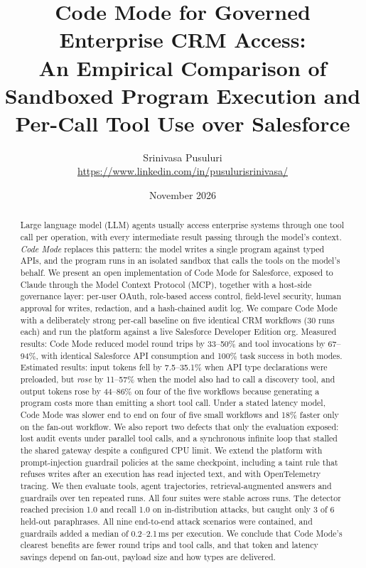 \documentclass[11pt]{article}
\title{Code Mode for Governed Enterprise CRM Access:\\
An Empirical Comparison of Sandboxed Program Execution and Per-Call Tool Use over Salesforce}
\author{Srinivasa Pusuluri\\[2pt]\small \url{https://www.linkedin.com/in/pusulurisrinivasa/}}
\date{November 2026}
\begin{document}
\maketitle

\begin{abstract}
Large language model (LLM) agents usually access enterprise systems through one tool call per operation, with every intermediate result passing through the model's context. \emph{Code Mode} replaces this pattern: the model writes a single program against typed APIs, and the program runs in an isolated sandbox that calls the tools on the model's behalf. We present an open implementation of Code Mode for Salesforce, exposed to Claude through the Model Context Protocol (MCP), together with a host-side governance layer: per-user OAuth, role-based access control, field-level security, human approval for writes, redaction, and a hash-chained audit log. We compare Code Mode with a deliberately strong per-call baseline on five identical CRM workflows (30 runs each) and run the platform against a live Salesforce Developer Edition org. Measured results: Code Mode reduced model round trips by 33--50\% and tool invocations by 67--94\%, with identical Salesforce API consumption and 100\% task success in both modes. Estimated results: input tokens fell by 7.5--35.1\% when API type declarations were preloaded, but \emph{rose} by 11--57\% when the model also had to call a discovery tool, and output tokens rose by 44--86\% on four of the five workflows because generating a program costs more than emitting a short tool call. Under a stated latency model, Code Mode was slower end to end on four of five small workflows and 18\% faster only on the fan-out workflow. We also report two defects that only the evaluation exposed: lost audit events under parallel tool calls, and a synchronous infinite loop that stalled the shared gateway despite a configured CPU limit. We extend the platform with prompt-injection guardrail policies at the same checkpoint, including a taint rule that refuses writes after an execution has read injected text, and with OpenTelemetry tracing. We then evaluate tools, agent trajectories, retrieval-augmented answers and guardrails over ten repeated runs. All four suites were stable across runs. The detector reached precision 1.0 and recall 1.0 on in-distribution attacks, but caught only 3 of 6 held-out paraphrases. All nine end-to-end attack scenarios were contained, and guardrails added a median of 0.2--2.1\,ms per execution. We conclude that Code Mode's clearest benefits are fewer round trips and tool calls, and that token and latency savings depend on fan-out, payload size and how types are delivered.
\end{abstract}
\end{document}
